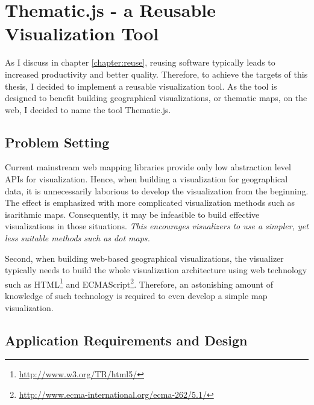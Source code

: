 
\chapter{Thematic.js - a Reusable Visualization Tool}
\label{chapter:implementation}




As I discuss in chapter \ref{chapter:reuse}, reusing software typically leads to increased productivity and better quality. Therefore, to achieve the targets of this thesis, I decided to implement a reusable visualization tool. As the tool is designed to benefit building geographical visualizations, or thematic maps, on the web, I decided to name the tool Thematic.js.

\section{Problem Setting}

Current mainstream web mapping libraries provide only low abstraction level APIs for visualization. Hence, when building a visualization for geographical data, it is unnecessarily laborious to develop the visualization from the beginning. The effect is emphasized with more complicated visualization methods such as isarithmic maps. Consequently, it may be infeasible to build effective visualizations in those situations. \emph{This encourages visualizers to use a simpler, yet less suitable methods such as dot maps.}

Second, when building web-based geographical visualizations, the visualizer typically needs to build the whole visualization architecture using web technology such as HTML\footnote{\url{http://www.w3.org/TR/html5/}} and ECMAScript\footnote{\url{http://www.ecma-international.org/ecma-262/5.1/}}. Therefore, an astonishing amount of knowledge of such technology is required to even develop a simple map visualization.

\section{Application Requirements and Design}
\label{section:requirements}

